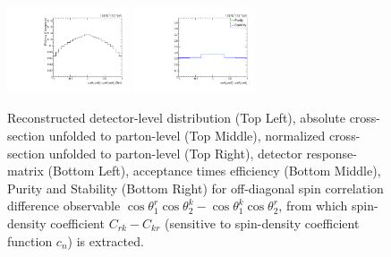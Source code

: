 \begin{figure}[htb]
\begin{center}
 \includegraphics[width=0.32\textwidth]{fig_fullRun2UL/unfolding/combined/TotEff_c_Mrk.pdf}
 \includegraphics[width=0.32\textwidth]{fig_fullRun2UL/unfolding/combined/PurStab_c_Mrk.pdf} \\
\caption{Reconstructed detector-level distribution (Top Left), absolute cross-section unfolded to parton-level (Top Middle), normalized cross-section unfolded to parton-level (Top Right), detector response-matrix (Bottom Left), acceptance times efficiency (Bottom Middle), Purity and Stability (Bottom Right) for off-diagonal spin correlation difference observable $\cos\theta_{1}^{r}\cos\theta_{2}^{k}-\cos\theta_{1}^{k}\cos\theta_{2}^{r}$, from which spin-density coefficient $C_{rk}-C_{kr}$ (sensitive to spin-density coefficient function $c_n$) is extracted.}
\label{fig:c_Mrk}
\end{center}
\end{figure}
\clearpage

